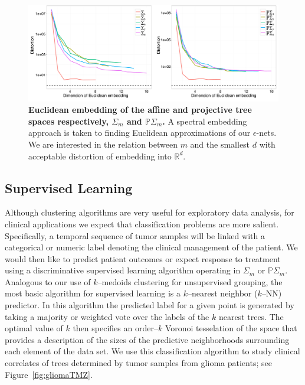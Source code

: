 \documentclass[a4paper,11pt]{article}
\begin{document}
\begin{figure}
    \centering
    \includegraphics[width=\linewidth]{../figures/stats_embedding.pdf}
    \caption{{\bf Euclidean embedding of the affine and projective tree spaces respectively, $\Sigma_m$ and $\mathbb{P}\Sigma_m$.} A spectral embedding approach is taken to finding Euclidean approximations of our $\epsilon$-nets. We are interested in the relation between $m$ and the smallest $d$ with acceptable distortion of embedding into $\mathbb{R}^d$.}
    \label{fig:embedding}
\end{figure}

\subsection{Supervised Learning}

Although clustering algorithms are very useful for exploratory data analysis, for clinical applications we expect that classification problems are more salient.
Specifically, a temporal sequence of tumor samples will be linked with a categorical or numeric label denoting the clinical management of the patient.
We would then like to predict patient outcomes or expect response to treatment using a discriminative supervised learning algorithm operating in $\Sigma_m$ or $\mathbb{P}\Sigma_m$.
Analogous to our use of $k$--medoids clustering for unsupervised grouping, the most basic algorithm for supervised learning is a $k$--nearest neighbor ($k$--NN) predictor.
In this algorithm the predicted label for a given point is generated by taking a majority or weighted vote over the labels of the $k$ nearest trees.
The optimal value of $k$ then specifies an order--$k$ Voronoi tesselation of the space that provides a description of the sizes of the predictive neighborhoods surrounding each element of the data set.
We use this classification algorithm to study clinical correlates of trees determined by tumor samples from glioma patients; see Figure~\ref{fig:gliomaTMZ}.

\end{document}
